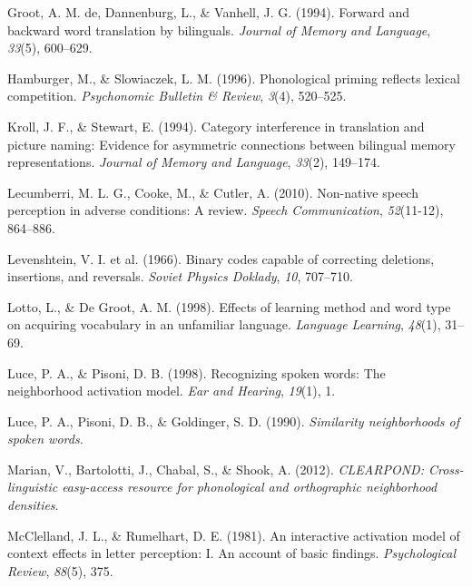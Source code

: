 \documentclass[
]{article}
\newlength{\cslhangindent}
\newenvironment{CSLReferences}[2] %
 {\begin{list}{}{%
  \setlength{\itemindent}{0pt}
  \setlength{\leftmargin}{0pt}
  \setlength{\parsep}{0pt}
  \ifodd #1
   \setlength{\leftmargin}{\cslhangindent}
   \setlength{\itemindent}{-1\cslhangindent}
  \fi
  \setlength{\itemsep}{#2\baselineskip}}}
 {\end{list}}
\begin{document}
\begin{CSLReferences}{1}{0}
Groot, A. M. de, Dannenburg, L., \& Vanhell, J. G. (1994). Forward and
backward word translation by bilinguals. \emph{Journal of Memory and
Language}, \emph{33}(5), 600--629.

Hamburger, M., \& Slowiaczek, L. M. (1996). Phonological priming
reflects lexical competition. \emph{Psychonomic Bulletin \& Review},
\emph{3}(4), 520--525.

Kroll, J. F., \& Stewart, E. (1994). Category interference in
translation and picture naming: Evidence for asymmetric connections
between bilingual memory representations. \emph{Journal of Memory and
Language}, \emph{33}(2), 149--174.

Lecumberri, M. L. G., Cooke, M., \& Cutler, A. (2010). Non-native speech
perception in adverse conditions: A review. \emph{Speech Communication},
\emph{52}(11-12), 864--886.

Levenshtein, V. I. et al. (1966). Binary codes capable of correcting
deletions, insertions, and reversals. \emph{Soviet Physics Doklady},
\emph{10}, 707--710.

Lotto, L., \& De Groot, A. M. (1998). Effects of learning method and
word type on acquiring vocabulary in an unfamiliar language.
\emph{Language Learning}, \emph{48}(1), 31--69.

Luce, P. A., \& Pisoni, D. B. (1998). Recognizing spoken words: The
neighborhood activation model. \emph{Ear and Hearing}, \emph{19}(1), 1.

Luce, P. A., Pisoni, D. B., \& Goldinger, S. D. (1990). \emph{Similarity
neighborhoods of spoken words.}

Marian, V., Bartolotti, J., Chabal, S., \& Shook, A. (2012).
\emph{CLEARPOND: Cross-linguistic easy-access resource for phonological
and orthographic neighborhood densities}.

McClelland, J. L., \& Rumelhart, D. E. (1981). An interactive activation
model of context effects in letter perception: I. An account of basic
findings. \emph{Psychological Review}, \emph{88}(5), 375.


\end{CSLReferences}
\end{document}
